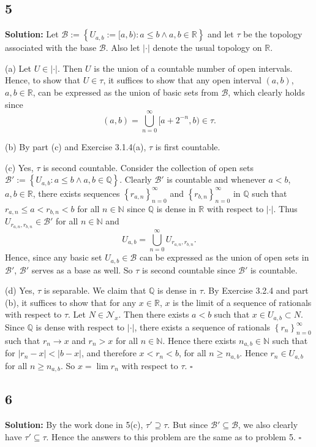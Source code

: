 \documentclass[12pt]{article}
\newcounter{ProofCounter}
\newenvironment{Solution}{\stepcounter{ProofCounter}\textbf{Solution:}}{\hfill$\square$}
\begin{document}
\subsection*{5}
\begin{Solution}
  Let $\mathcal{B} := \left\{ U_{a,b} := [a,b) : a \leq b \wedge a,b\in \mathbb{R} \right\}$ and let $\tau$ be the topology associated with the base $\mathcal{B}$.
  Also let $|\cdot|$ denote the usual topology on $\mathbb{R}$.

  (a) Let $U \in |\cdot|$. Then $U$ is the union of a countable number of open intervals. Hence, to show that $U \in \tau$, it suffices to show that
  any open interval $(a,b)$, $a,b \in \mathbb{R}$, can be expressed as the union of basic sets from $\mathcal{B}$, which clearly holds since 
  \[
    (a,b) = \bigcup_{n=0}^{\infty}[a + 2^{-n}, b) \in \tau.
  \]

  (b) By part (c) and Exercise 3.1.4(a), $\tau$ is first countable.

  (c) Yes, $\tau$ is second countable. Consider the collection of open sets $\mathcal{B}' := \left\{ U_{a,b} : a \leq b \wedge a,b \in \mathbb{Q} \right\}$. Clearly
  $\mathcal{B}'$ is countable and whenever $a < b$, $a,b \in \mathbb{R}$, there exists sequences $\left\{ r_{a,n} \right\}_{n=0}^{\infty}$ and 
  $\left\{ r_{b,n} \right\}_{n=0}^{\infty}$ in $\mathbb{Q}$ such that $r_{a,n} \leq a < r_{b,n} < b$ for all $n \in \mathbb{N}$ since $\mathbb{Q}$ is
  dense in $\mathbb{R}$ with respect to $|\cdot|$. Thus $U_{r_{a,n},r_{b,n}} \in \mathcal{B}'$ for all $n \in \mathbb{N}$ and 
  \[
    U_{a,b} = \bigcup_{n=0}^{\infty}U_{r_{a,n},r_{b,n}}.
  \]
  Hence, since any basic set $U_{a,b} \in \mathcal{B}$ can be expressed as the union of open sets in $\mathcal{B}'$, $\mathcal{B}'$ serves as a base
  as well. So $\tau$ is second countable since $\mathcal{B}'$ is countable.

  (d) Yes, $\tau$ is separable. We claim that $\mathbb{Q}$ is dense in $\tau$. By Exercise 3.2.4 and part (b), it suffices to show that for any $x \in
  \mathbb{R}$, $x$ is the limit of a sequence of rationals with respect to $\tau$. Let $N \in \mathcal{N}_x$. Then there exists $a < b$ such that $x \in U_{a,b} \subset N$.
  Since $\mathbb{Q}$ is dense with respect to $|\cdot|$, there exists a sequence of rationals $\left\{ r_n \right\}_{n=0}^{\infty}$ such that $r_n
  \rightarrow x$ and $r_n > x$ for all $n \in \mathbb{N}$. Hence there exists $n_{a,b} \in\mathbb{N}$ such that for $|r_n - x| < |b - x|$,
  and therefore $x < r_n < b$, for all $n
  \geq n_{a,b}$. Hence $r_n \in U_{a,b}$ for all $n \geq n_{a,b}$. So $x = \lim r_n$ with respect to $\tau$.
\end{Solution}

\subsection*{6}
\begin{Solution}
  By the work done in 5(c), $\tau' \supseteq \tau$. But since $\mathcal{B}' \subseteq \mathcal{B}$, we also clearly have $\tau' \subseteq \tau$.
  Hence the answers to this problem are the same as to problem 5.
\end{Solution}
\end{document}

